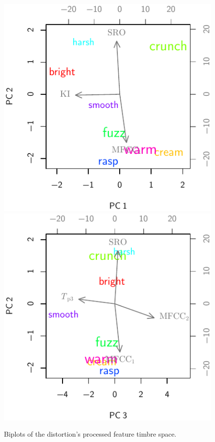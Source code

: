 			\begin{figure}[h!]
				\centering
				\subfloat
				{
					\includegraphics{chapter4/Images/DistortionProcessedCentroidsPCA1-2.pdf}
					\label{fig:DistortionProcessedCentroidsPCA1-2}
				}
				\quad
				\subfloat
				{
					\includegraphics{chapter4/Images/DistortionProcessedCentroidsPCA3-2.pdf}
					\label{fig:DistortionProcessedCentroidsPCA3-2}
				}
				\caption{Biplots of the distortion's processed feature timbre space.}
				\label{fig:DistortionProcessedCentroidsPCAs}
			\end{figure}

